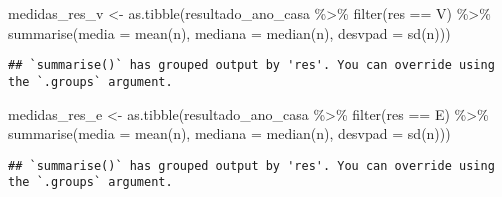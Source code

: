 \documentclass[
]{article}
\newenvironment{Shaded}{\begin{snugshade}}{\end{snugshade}}
\newcommand{\FunctionTok}[1]{\textcolor[rgb]{0.00,0.00,0.00}{#1}}
\newcommand{\NormalTok}[1]{#1}
\newcommand{\OtherTok}[1]{\textcolor[rgb]{0.56,0.35,0.01}{#1}}
\newcommand{\SpecialCharTok}[1]{\textcolor[rgb]{0.00,0.00,0.00}{#1}}
\newcommand{\StringTok}[1]{\textcolor[rgb]{0.31,0.60,0.02}{#1}}
\begin{document}
\begin{Shaded}
\begin{Highlighting}[]
\NormalTok{medidas\_res\_v }\OtherTok{\textless{}{-}} \FunctionTok{as.tibble}\NormalTok{(resultado\_ano\_casa }\SpecialCharTok{\%\textgreater{}\%} \FunctionTok{filter}\NormalTok{(res }\SpecialCharTok{==} \StringTok{\textquotesingle{}V\textquotesingle{}}\NormalTok{) }\SpecialCharTok{\%\textgreater{}\%} 
                             \FunctionTok{summarise}\NormalTok{(}\StringTok{\textquotesingle{}media\textquotesingle{}} \OtherTok{=} \FunctionTok{mean}\NormalTok{(n),}
                                       \StringTok{\textquotesingle{}mediana\textquotesingle{}} \OtherTok{=} \FunctionTok{median}\NormalTok{(n),}
                                       \StringTok{\textquotesingle{}desvpad\textquotesingle{}} \OtherTok{=} \FunctionTok{sd}\NormalTok{(n)))}
\end{Highlighting}
\end{Shaded}

\begin{verbatim}
## `summarise()` has grouped output by 'res'. You can override using the `.groups` argument.
\end{verbatim}

\begin{Shaded}
\begin{Highlighting}[]
\NormalTok{medidas\_res\_e }\OtherTok{\textless{}{-}} \FunctionTok{as.tibble}\NormalTok{(resultado\_ano\_casa }\SpecialCharTok{\%\textgreater{}\%} \FunctionTok{filter}\NormalTok{(res }\SpecialCharTok{==} \StringTok{\textquotesingle{}E\textquotesingle{}}\NormalTok{) }\SpecialCharTok{\%\textgreater{}\%} 
                             \FunctionTok{summarise}\NormalTok{(}\StringTok{\textquotesingle{}media\textquotesingle{}} \OtherTok{=} \FunctionTok{mean}\NormalTok{(n),}
                                       \StringTok{\textquotesingle{}mediana\textquotesingle{}} \OtherTok{=} \FunctionTok{median}\NormalTok{(n),}
                                       \StringTok{\textquotesingle{}desvpad\textquotesingle{}} \OtherTok{=} \FunctionTok{sd}\NormalTok{(n)))}
\end{Highlighting}
\end{Shaded}

\begin{verbatim}
## `summarise()` has grouped output by 'res'. You can override using the `.groups` argument.
\end{verbatim}
\end{document}
